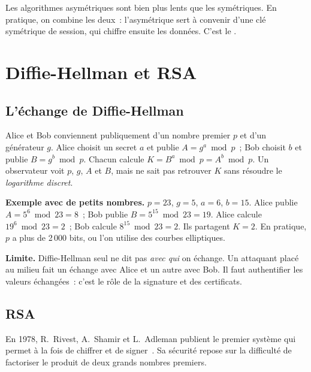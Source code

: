 Les algorithmes asymétriques sont bien plus lents que les symétriques. En
pratique, on combine les deux~: l'asymétrique sert à convenir d'une clé
symétrique de session, qui chiffre ensuite les données. C'est le
.

\section{Diffie-Hellman et RSA}
\label{sec:c04-algos}

\subsection{L'échange de Diffie-Hellman}

Alice et Bob conviennent publiquement d'un nombre premier \(p\) et d'un
générateur \(g\). Alice choisit un secret \(a\) et publie
\(A = g^a \bmod p\)~; Bob choisit \(b\) et publie \(B = g^b \bmod p\).
Chacun calcule \(K = B^a \bmod p = A^b \bmod p\). Un observateur voit
\(p\), \(g\), \(A\) et \(B\), mais ne sait pas retrouver \(K\) sans
résoudre le \emph{logarithme discret}.

\begin{boxinfo}
\textbf{Exemple avec de petits nombres.} \(p = 23\), \(g = 5\), \(a = 6\),
\(b = 15\). Alice publie \(A = 5^6 \bmod 23 = 8\)~; Bob publie
\(B = 5^{15} \bmod 23 = 19\). Alice calcule \(19^6 \bmod 23 = 2\)~; Bob
calcule \(8^{15} \bmod 23 = 2\). Ils partagent \(K = 2\). En pratique,
\(p\) a plus de 2\,000 bits, ou l'on utilise des courbes elliptiques.
\end{boxinfo}

\begin{boxalert}
\textbf{Limite.} Diffie-Hellman seul ne dit pas \emph{avec qui} on
échange. Un attaquant placé au milieu fait un échange avec Alice et un
autre avec Bob. Il faut authentifier les valeurs échangées~: c'est le
rôle de la signature et des certificats.
\end{boxalert}

\subsection{RSA}

En 1978, R.~Rivest, A.~Shamir et L.~Adleman publient le premier système
qui permet à la fois de chiffrer et de signer~\cite{rivest1978}. Sa
sécurité repose sur la difficulté de factoriser le produit de deux grands
nombres premiers.

